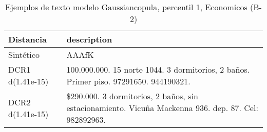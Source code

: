 \begin{table}[H]
\centering
\fontsize{10}{14}\selectfont
\caption{Ejemplos de texto modelo Gaussiancopula, percentil 1, Economicos (B-2)}
\label{table-example-economicos-b-2-gaussiancopula-1p-text}
\begin{tabular}{|l|m{35em}|}
\hline
\rowcolor[gray]{0.8}
Distancia & description \\
\hline Sintético & AAAfK \\
\hline DCR1 d(1.41e-15) & 100.000.000. 15 norte 1044. 3 dormitorios, 2 ba\~nos. Primer piso. 97291650. 944190321. \\
\hline DCR2 d(1.41e-15) & \$290.000. 3 dormitorios, 2 ba\~nos, sin estacionamiento. Vicu\~na Mackenna 936. dep. 87. Cel: 982892963. \\
\hline
\end{tabular}
\end{table}
